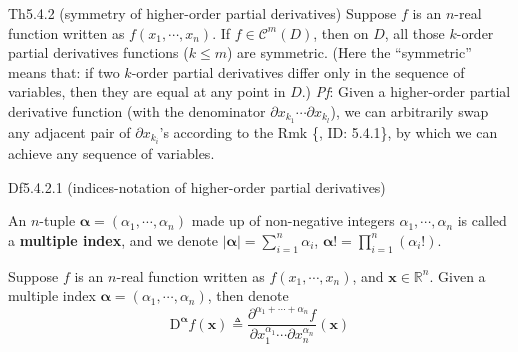 \documentclass{article}
\begin{document}
\begin{Th}{Th5.4.2 (symmetry of higher-order partial derivatives)}
    Suppose $f$ is an $n$-real function written as $f(x_1, \cdots, x_n)$. If $f\in\mathcal{C}^m(D)$, then on $D$, all those $k$-order partial derivatives functions ($k\leq m$) are symmetric. (Here the ``symmetric'' means that: if two $k$-order partial derivatives differ only in the sequence of variables, then they are equal at any point in $D$.)
    \tcblower
    \textit{Pf}: Given a higher-order partial derivative function (with the denominator $\partial x_{k_1}\cdots\partial x_{k_l}$), we can arbitrarily swap any adjacent pair of $\partial x_{k_i}$'s according to the Rmk \{, ID: 5.4.1\}, by which we can achieve any sequence of variables.
\end{Th}

\begin{Df}{Df5.4.2.1 (indices-notation of higher-order partial derivatives)}
    \begin{compactenum}
        \item An $n$-tuple $\pmb{\alpha} = (\alpha_1, \cdots, \alpha_n)$ made up of non-negative integers $\alpha_1, \cdots, \alpha_n$ is called a \textbf{multiple index}, and we denote $|\pmb{\alpha}| = \sum_{i=1}^{n} \alpha_i$, $\pmb{\alpha !} = \prod_{i=1}^{n}(\alpha_i!)$.
        \item Suppose $f$ is an $n$-real function written as $f(x_1, \cdots, x_n)$, and $\pmb{x}\in\mathbb{R}^n$. Given a multiple index $\pmb{\alpha} = (\alpha_1, \cdots, \alpha_n)$, then denote 
        $$ \mathrm{D}^{\pmb{\alpha}} f(\pmb{x}) \triangleq \frac{\partial^{\alpha_1+\cdots+\alpha_n} f}{\partial x_1^{\alpha_1}\cdots\partial x_n^{\alpha_n}} (\pmb{x}) $$
    \end{compactenum}
\end{Df}
\end{document}
